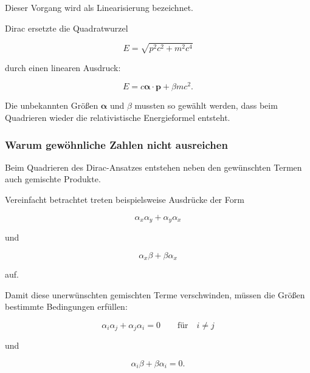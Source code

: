 Dieser Vorgang wird als Linearisierung%
 bezeichnet.

\begin{PhysicsBox}
	\label{box:diracs_linearisierung}
	
	Dirac ersetzte die Quadratwurzel
	
	\begin{equation}
		E
		=
		\sqrt{
			p^2c^2
			+
			m^2c^4
		}
	\end{equation}
	
	durch einen linearen Ausdruck:
	
	\begin{equation}
		E
		=
		c\boldsymbol{\alpha}\cdot\mathbf{p}
		+
		\beta mc^2.
	\end{equation}
	
	Die unbekannten Größen \(\boldsymbol{\alpha}\) und \(\beta\) mussten so
	gewählt werden, dass beim Quadrieren wieder die relativistische
	Energieformel entsteht.
\end{PhysicsBox}

\subsubsection*{Warum gewöhnliche Zahlen nicht ausreichen}

Beim Quadrieren des Dirac-Ansatzes entstehen neben den gewünschten
Termen auch gemischte Produkte.

Vereinfacht betrachtet treten beispielsweise Ausdrücke der Form

\begin{equation}
	\alpha_x\alpha_y
	+
	\alpha_y\alpha_x
\end{equation}

und

\begin{equation}
	\alpha_x\beta
	+
	\beta\alpha_x
\end{equation}

auf.

Damit diese unerwünschten gemischten Terme verschwinden, müssen die
Größen bestimmte Bedingungen erfüllen:

\begin{equation}
	\alpha_i\alpha_j
	+
	\alpha_j\alpha_i
	=
	0
	\qquad
	\text{für}
	\quad
	i\neq j
\end{equation}

und

\begin{equation}
	\alpha_i\beta
	+
	\beta\alpha_i
	=
	0.
\end{equation}

